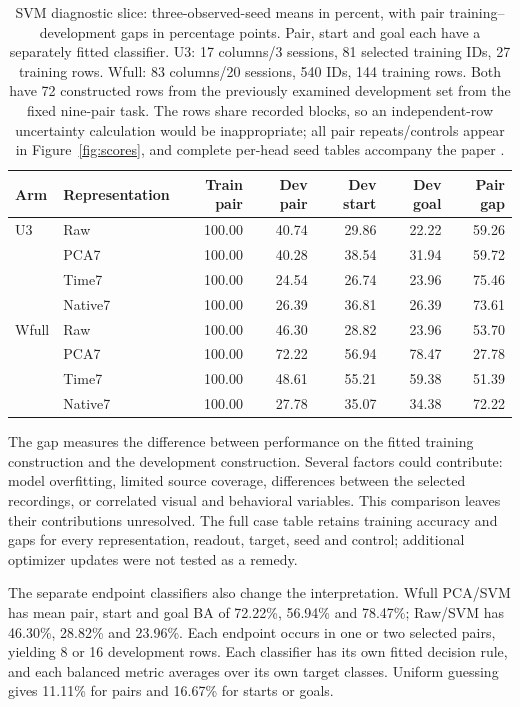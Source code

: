 \documentclass[10pt,a4paper]{article}
\begin{document}
\begin{table}[h!]
\caption{SVM diagnostic slice: three-observed-seed means in percent, with pair training--development gaps in percentage points. Pair, start and goal each have a separately fitted classifier. U3: 17 columns/3 sessions, 81 selected training IDs, 27 training rows. Wfull: 83 columns/20 sessions, 540 IDs, 144 training rows. Both have 72 constructed rows from the previously examined development set from the fixed nine-pair task. The rows share recorded blocks, so an independent-row uncertainty calculation would be inappropriate; all pair repeats/controls appear in Figure~\ref{fig:scores}, and complete per-head seed tables accompany the paper \cite{latest,reproduction}.}
\label{tab:gaps}\small
\begin{tabularx}{\linewidth}{lYrrrrr}
\toprule
Arm & Representation & Train pair & Dev pair & Dev start & Dev goal & Pair gap \\
\midrule
U3 & Raw & 100.00 & 40.74 & 29.86 & 22.22 & 59.26 \\
 & PCA7 & 100.00 & 40.28 & 38.54 & 31.94 & 59.72 \\
 & Time7 & 100.00 & 24.54 & 26.74 & 23.96 & 75.46 \\
 & Native7 & 100.00 & 26.39 & 36.81 & 26.39 & 73.61 \\
\midrule
Wfull & Raw & 100.00 & 46.30 & 28.82 & 23.96 & 53.70 \\
 & PCA7 & 100.00 & 72.22 & 56.94 & 78.47 & 27.78 \\
 & Time7 & 100.00 & 48.61 & 55.21 & 59.38 & 51.39 \\
 & Native7 & 100.00 & 27.78 & 35.07 & 34.38 & 72.22 \\
\bottomrule
\end{tabularx}
\end{table}

The gap measures the difference between performance on the fitted training construction and the development construction. Several factors could contribute: model overfitting, limited source coverage, differences between the selected recordings, or correlated visual and behavioral variables. This comparison leaves their contributions unresolved. The full case table retains training accuracy and gaps for every representation, readout, target, seed and control; additional optimizer updates were not tested as a remedy.

The separate endpoint classifiers also change the interpretation. Wfull PCA/SVM has mean pair, start and goal BA of 72.22\%, 56.94\% and 78.47\%; Raw/SVM has 46.30\%, 28.82\% and 23.96\%. Each endpoint occurs in one or two selected pairs, yielding 8 or 16 development rows. Each classifier has its own fitted decision rule, and each balanced metric averages over its own target classes. Uniform guessing gives 11.11\% for pairs and 16.67\% for starts or goals.
\end{document}
